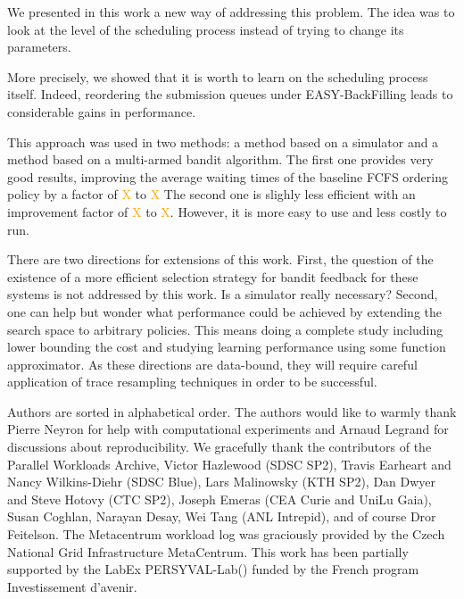 \documentclass[sigconf,review,anonymous]{acmart}
\begin{document}
We presented in this work a new way of addressing this problem.  The idea was
to look at the level of the scheduling process instead of trying to change its
parameters.

More precisely, we showed that it is worth to learn on the scheduling process
itself. Indeed, reordering the submission queues under EASY-BackFilling leads
to considerable gains in performance.

This approach was used in two methods: a method based on a simulator and a
method based on a multi-armed bandit algorithm. The first one provides very good results,
improving the average waiting times of the baseline FCFS ordering policy by a
factor of \textcolor{orange}{X} to \textcolor{orange}{X} The second one is
slighly less efficient with an improvement factor of  \textcolor{orange}{X} to
\textcolor{orange}{X}. However, it is more easy to use and less costly to run.

There are two directions for extensions of this work.  First, the question of
the existence of a more efficient selection strategy for bandit feedback for
these systems is not addressed by this work. Is a simulator really necessary?
Second, one can help but wonder what performance could be achieved by extending
the search space to arbitrary policies. This means doing a complete study
including lower bounding the cost and studying learning performance using some
function approximator.
As these directions are data-bound, they will require careful application of
trace resampling techniques in order to be successful.

\begin{acks}

Authors are sorted in alphabetical order. The authors would like to warmly
thank Pierre Neyron for help with computational experiments and Arnaud Legrand
for discussions about reproducibility. We gracefully thank the contributors of
the Parallel Workloads Archive, Victor Hazlewood (SDSC SP2), Travis Earheart
and Nancy Wilkins-Diehr (SDSC Blue), Lars Malinowsky (KTH SP2), Dan Dwyer and
Steve Hotovy (CTC SP2), Joseph Emeras (CEA Curie and UniLu Gaia), Susan
Coghlan, Narayan Desay, Wei Tang (ANL Intrepid), and of course Dror Feitelson.
The Metacentrum workload log was graciously provided by the Czech National Grid
Infrastructure MetaCentrum. This work has been partially supported by the LabEx
PERSYVAL-Lab() funded by
the French program Investissement d'avenir.
\end{acks}
\end{document}
